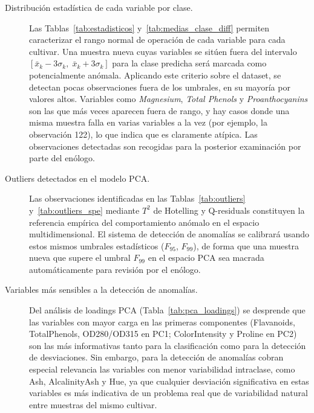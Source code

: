     \begin{description}
        \item[Distribuci\'on estad\'istica de cada variable por clase.]
        Las Tablas~\ref{tab:estadisticos} y~\ref{tab:medias_clase_diff} permiten
        caracterizar el rango normal de operaci\'on de cada variable para cada
        cultivar. Una muestra nueva cuyas variables se sit\'uen fuera del
        intervalo $[\bar{x}_k - 3\sigma_k,\; \bar{x}_k + 3\sigma_k]$ para la
        clase predicha ser\'a marcada como potencialmente an\'omala. Aplicando 
        este criterio sobre el dataset, se detectan pocas observaciones
        fuera de los umbrales, en su mayor\'ia por valores altos. Variables como
        \textit{Magnesium}, \textit{Total Phenols} y \textit{Proanthocyanins}
        son las que m\'as veces aparecen fuera de rango, y hay casos donde una
        misma muestra falla en varias variables a la vez (por ejemplo, la
        observaci\'on 122), lo que indica que es claramente at\'ipica. 
        Las observaciones detectadas son recogidas para la posterior examinación
        por parte del enólogo. 

        \item[Outliers detectados en el modelo PCA.]
        Las observaciones identificadas en las Tablas~\ref{tab:outliers}
        y~\ref{tab:outliers_spe} mediante $T^2$ de Hotelling y Q-residuals
        constituyen la referencia emp\'irica del comportamiento an\'omalo en el
        espacio multidimensional. El sistema de detecci\'on de anomal\'ias se
        calibrar\'a usando estos mismos umbrales estad\'isticos ($F_{95}$,
        $F_{99}$), de forma que una muestra nueva que supere el umbral $F_{99}$
        en el espacio PCA sea macrada autom\'aticamente para revisi\'on por el
        en\'ologo.

        \item[Variables m\'as sensibles a la detecci\'on de anomal\'ias.]
        Del an\'alisis de loadings PCA (Tabla~\ref{tab:pca_loadings}) se desprende
        que las variables con mayor carga en las primeras componentes
        (Flavanoids, TotalPhenols, OD280/OD315 en PC1; ColorIntensity y Proline
        en PC2) son las m\'as informativas tanto para la clasificaci\'on como para
        la detecci\'on de desviaciones. Sin embargo, para la detecci\'on de
        anomal\'ias cobran especial relevancia las variables con menor variabilidad
        intraclase, como Ash, AlcalinityAsh y Hue, ya que cualquier desviaci\'on
        significativa en estas variables es m\'as indicativa de un problema real
        que de variabilidad natural entre muestras del mismo cultivar.

    \end{description}


